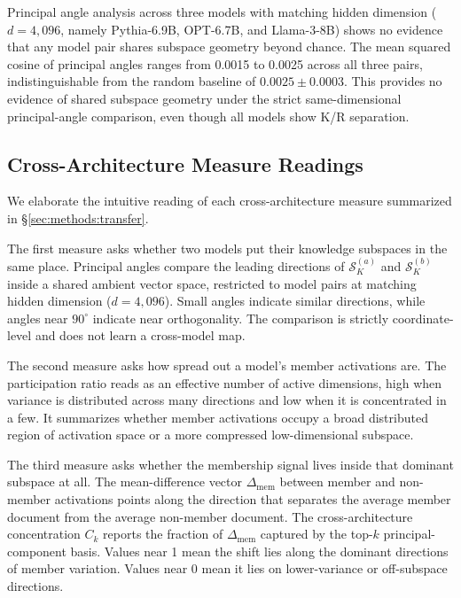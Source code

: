 Principal angle analysis across three models with matching hidden dimension ($d = 4{,}096$, namely Pythia-6.9B, OPT-6.7B, and Llama-3-8B) shows no evidence that any model pair shares subspace geometry beyond chance.
The mean squared cosine of principal angles ranges from 0.0015 to 0.0025 across all three pairs, indistinguishable from the random baseline of $0.0025 \pm 0.0003$.
This provides no evidence of shared subspace geometry under the strict same-dimensional principal-angle comparison, even though all models show K/R separation.

\subsection{Cross-Architecture Measure Readings}
\label{app:cross_arch_readings}

We elaborate the intuitive reading of each cross-architecture measure summarized in \S\ref{sec:methods:transfer}.

The first measure asks whether two models put their knowledge subspaces in the same place. Principal angles compare the leading directions of $\mathcal{S}_{K}^{(a)}$ and $\mathcal{S}_{K}^{(b)}$ inside a shared ambient vector space, restricted to model pairs at matching hidden dimension ($d = 4{,}096$). Small angles indicate similar directions, while angles near $90^\circ$ indicate near orthogonality. The comparison is strictly coordinate-level and does not learn a cross-model map.

The second measure asks how spread out a model's member activations are. The participation ratio reads as an effective number of active dimensions, high when variance is distributed across many directions and low when it is concentrated in a few. It summarizes whether member activations occupy a broad distributed region of activation space or a more compressed low-dimensional subspace.

The third measure asks whether the membership signal lives inside that dominant subspace at all. The mean-difference vector $\Delta_{\mathrm{mem}}$ between member and non-member activations points along the direction that separates the average member document from the average non-member document. The cross-architecture concentration $C_k$ reports the fraction of $\Delta_{\mathrm{mem}}$ captured by the top-$k$ principal-component basis. Values near 1 mean the shift lies along the dominant directions of member variation. Values near 0 mean it lies on lower-variance or off-subspace directions.

